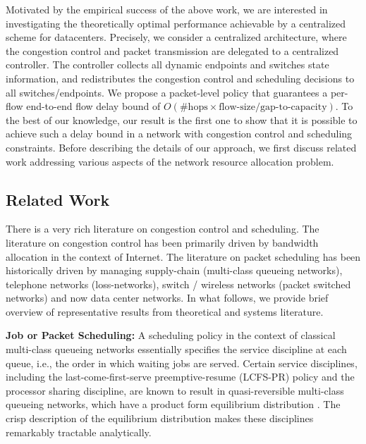 \documentclass[ssy,preprint]{imsart_axv}
\numberwithin{equation}{section}
\theoremstyle{plain}
\theoremstyle{definition}
\theoremstyle{remark}
\theoremstyle{plain}
\theoremstyle{plain}
\begin{document}
Motivated by the empirical success of the above work, we are interested
in investigating the theoretically optimal performance achievable by a centralized
scheme for datacenters. Precisely, we consider a centralized architecture,
where the congestion control and packet transmission are delegated
to a centralized controller. The controller collects all dynamic endpoints
and switches state information, and redistributes the congestion control
and scheduling decisions to all switches/endpoints. We propose a packet-level
policy that guarantees a per-flow end-to-end flow delay bound of $\ensuremath{O}(\#\text{hops}\ensuremath{\times}\text{flow-size}\ensuremath{/}\text{gap-to-capacity})$.
To the best of our knowledge, our result is the first one to show
that it is possible to achieve such a delay bound in a network with
congestion control and scheduling constraints. Before describing the
details of our approach, we first discuss related work addressing
various aspects of the network resource allocation problem. 

\subsection{Related Work}

There is a very rich literature on congestion control and scheduling. The literature
on congestion control has been primarily driven by bandwidth allocation in the
context of Internet. The literature on packet scheduling has been historically 
driven by managing supply-chain (multi-class queueing networks), telephone
networks (loss-networks), switch / wireless networks (packet
switched networks) and now data center networks. In what follows, we 
provide brief overview of representative results from theoretical and 
systems literature. 


\medskip
\noindent\textbf{Job or Packet Scheduling:} A scheduling policy in the context 
of classical multi-class queueing networks essentially specifies the service 
discipline at each queue, i.e., the order in which waiting jobs are served. Certain
service disciplines, including the last-come-first-serve preemptive-resume
(LCFS-PR) policy and the processor sharing discipline, are known to
result in quasi-reversible multi-class queueing networks, which have
a product form equilibrium distribution \cite{kelly1979reversibility}. The crisp 
description of the equilibrium distribution makes these disciplines remarkably 
tractable analytically. 
\end{document}
